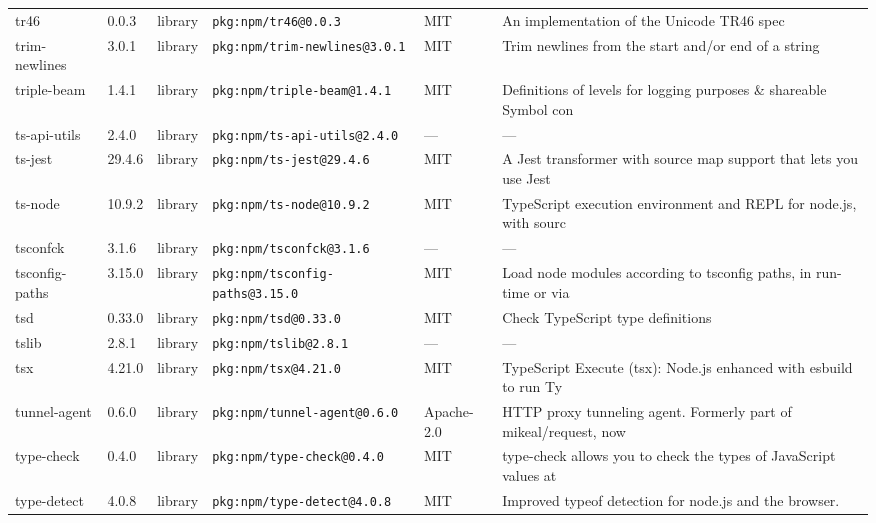 \documentclass[11pt,a4paper]{article}
\begin{document}
\begin{longtable}{|p{4cm}|p{2cm}|p{1.6cm}|p{5cm}|p{1.5cm}|p{3.5cm}|}
\raggedright tr46 & 0.0.3 & library & \small\texttt{pkg:npm/tr46@0.0.3} & MIT & \small An implementation of the Unicode TR46 spec \\
\raggedright trim-newlines & 3.0.1 & library & \small\texttt{pkg:npm/trim-newlines@3.0.1} & MIT & \small Trim newlines from the start and/or end of a string \\
\raggedright triple-beam & 1.4.1 & library & \small\texttt{pkg:npm/triple-beam@1.4.1} & MIT & \small Definitions of levels for logging purposes \& shareable Symbol con \\
\raggedright ts-api-utils & 2.4.0 & library & \small\texttt{pkg:npm/ts-api-utils@2.4.0} & — & \small — \\
\raggedright ts-jest & 29.4.6 & library & \small\texttt{pkg:npm/ts-jest@29.4.6} & MIT & \small A Jest transformer with source map support that lets you use Jest \\
\raggedright ts-node & 10.9.2 & library & \small\texttt{pkg:npm/ts-node@10.9.2} & MIT & \small TypeScript execution environment and REPL for node.js, with sourc \\
\raggedright tsconfck & 3.1.6 & library & \small\texttt{pkg:npm/tsconfck@3.1.6} & — & \small — \\
\raggedright tsconfig-paths & 3.15.0 & library & \small\texttt{pkg:npm/tsconfig-paths@3.15.0} & MIT & \small Load node modules according to tsconfig paths, in run-time or via \\
\raggedright tsd & 0.33.0 & library & \small\texttt{pkg:npm/tsd@0.33.0} & MIT & \small Check TypeScript type definitions \\
\raggedright tslib & 2.8.1 & library & \small\texttt{pkg:npm/tslib@2.8.1} & — & \small — \\
\raggedright tsx & 4.21.0 & library & \small\texttt{pkg:npm/tsx@4.21.0} & MIT & \small TypeScript Execute (tsx): Node.js enhanced with esbuild to run Ty \\
\raggedright tunnel-agent & 0.6.0 & library & \small\texttt{pkg:npm/tunnel-agent@0.6.0} & Apache-2.0 & \small HTTP proxy tunneling agent. Formerly part of mikeal/request, now  \\
\raggedright type-check & 0.4.0 & library & \small\texttt{pkg:npm/type-check@0.4.0} & MIT & \small type-check allows you to check the types of JavaScript values at  \\
\raggedright type-detect & 4.0.8 & library & \small\texttt{pkg:npm/type-detect@4.0.8} & MIT & \small Improved typeof detection for node.js and the browser. \\

\end{longtable}
\end{document}
